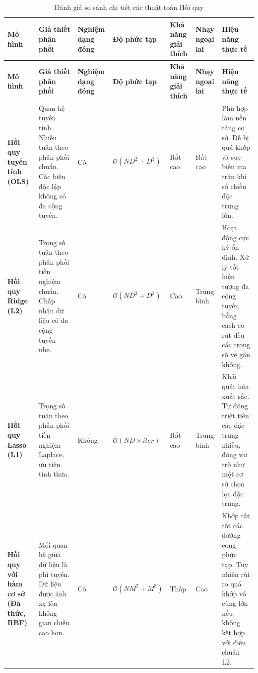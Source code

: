 \setlength\LTleft{-0.6cm}
\setlength\LTright{0pt}
\begin{longtable}{|>{\raggedright\arraybackslash}p{2.25cm}|>{\raggedright\arraybackslash}p{2.8cm}|>{\centering\arraybackslash}p{1.4cm}|>{\centering\arraybackslash}p{1.95cm}|>{\centering\arraybackslash}p{1.3cm}|>{\centering\arraybackslash}p{1.3cm}|>{\raggedright\arraybackslash}p{2.7cm}|}
    \caption{Đánh giá so sánh chi tiết các thuật toán Hồi quy} \\
    \hline
    \centering\textbf{Mô hình} & \centering\textbf{Giả thiết phân phối} & \textbf{Nghiệm dạng đóng} & \textbf{Độ phức tạp} & \textbf{Khả năng giải thích} & \textbf{Nhạy ngoại lai} & \centering\arraybackslash\textbf{Hiệu năng thực tế} \\
    \hline
    \endfirsthead
    \hline
    \centering\textbf{Mô hình} & \centering\textbf{Giả thiết phân phối} & \textbf{Nghiệm dạng đóng} & \textbf{Độ phức tạp} & \textbf{Khả năng giải thích} & \textbf{Nhạy ngoại lai} & \centering\arraybackslash\textbf{Hiệu năng thực tế} \\
    \hline
    \endhead
    \hline
    \endfoot
    \hline
    \endlastfoot
    \textbf{Hồi quy tuyến tính (OLS)} & Quan hệ tuyến tính. Nhiễu tuân theo phân phối chuẩn. Các biến độc lập không có đa cộng tuyến. & Có & $\mathcal{O}(ND^2 + D^3)$ & Rất cao & Rất cao & Phù hợp làm nền tảng cơ sở. Dễ bị quá khớp và suy biến ma trận khi số chiều đặc trưng lớn. \\
    \hline
    \textbf{Hồi quy Ridge (L2)} & Trọng số tuân theo phân phối tiền nghiệm chuẩn. Chấp nhận dữ liệu có đa cộng tuyến nhẹ. & Có & $\mathcal{O}(ND^2 + D^3)$ & Cao & Trung bình & Hoạt động cực kỳ ổn định. Xử lý tốt hiện tượng đa cộng tuyến bằng cách co rút đều các trọng số về gần không. \\
    \hline
    \textbf{Hồi quy Lasso (L1)} & Trọng số tuân theo phân phối tiền nghiệm Laplace, ưu tiên tính thưa. & Không & $\mathcal{O}(ND \times iter)$ & Rất cao & Trung bình & Khái quát hóa xuất sắc. Tự động triệt tiêu các đặc trưng nhiễu, đóng vai trò như một cơ sở chọn lọc đặc trưng. \\
    \hline
    \textbf{Hồi quy với hàm cơ sở (Đa thức, RBF)} & Mối quan hệ giữa dữ liệu là phi tuyến. Dữ liệu được ánh xạ lên không gian chiều cao hơn. & Có & $\mathcal{O}(NM^2 + M^3)$ & Thấp & Cao & Khớp rất tốt các đường cong phức tạp. Tuy nhiên rủi ro quá khớp vô cùng lớn nếu không kết hợp với điều chuẩn L2. \\
\end{longtable}

